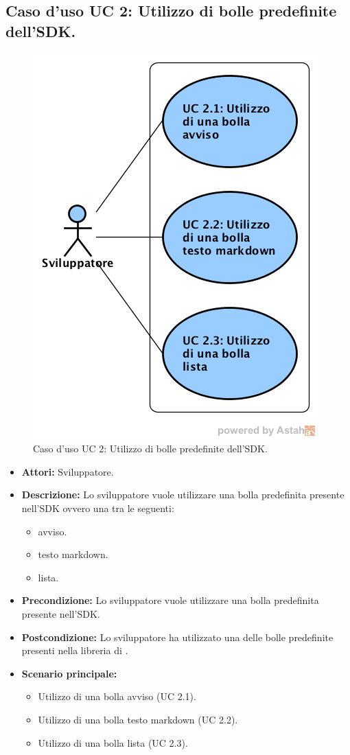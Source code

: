 \newpage
\subsection{Caso d'uso UC 2: Utilizzo di bolle predefinite dell'SDK.}
\label{Caso d'uso UC 2: Utilizzo di bolle predefinite dell'SDK.}
\begin{figure}[ht]
	\centering
	\includegraphics[scale=0.60]{Usecases/img/UC2.png}
	\caption{Caso d'uso UC 2: Utilizzo di bolle predefinite dell'SDK.}
\end{figure}

\FloatBarrier
\begin{itemize}
\item \textbf{Attori:} Sviluppatore.
\item \textbf{Descrizione:} Lo sviluppatore vuole utilizzare una bolla predefinita presente nell'SDK ovvero una tra le seguenti:
\begin{itemize}
\item {} avviso.
\item {} testo markdown.
\item {} lista.
\end{itemize} 
\item \textbf{Precondizione:} Lo sviluppatore vuole utilizzare una bolla predefinita presente nell'SDK. 
\item \textbf{Postcondizione:} Lo sviluppatore ha utilizzato una delle bolle predefinite presenti nella libreria di \progetto.
\item \textbf{Scenario principale:}
	\begin{itemize}
	\item{Utilizzo di una bolla avviso (UC 2.1).}
	\item{Utilizzo di una bolla testo markdown (UC 2.2).}
	\item{Utilizzo di una bolla lista (UC 2.3).}
	\end{itemize}
\end{itemize}